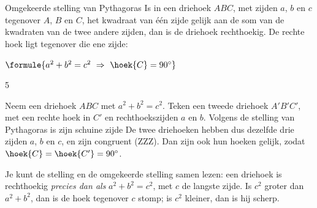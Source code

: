 \begin{theorie}
\begin{stelling}{Omgekeerde stelling van Pythagoras}
Is in een driehoek $ABC$, met zijden $a$, $b$ en $c$ tegenover $A$, $B$ en $C$, het kwadraat van één zijde gelijk aan de som van de kwadraten van de twee andere zijden, dan is de driehoek rechthoekig. De rechte hoek ligt tegenover die ene zijde:

\vspace{1mm}
\qquad $\formule{a^2 + b^2 = c^2 \ \Rightarrow \ \hoek{C} = 90^\circ}$
\end{stelling}
\begin{alleenvoor}{5}

\begin{bewijs}
Neem een driehoek $ABC$ met $a^2 + b^2 = c^2$. Teken een tweede driehoek $A'B'C'$, met een rechte hoek in $C'$ en rechthoekszijden $a$ en $b$. Volgens de stelling van Pythagoras is zijn schuine zijde
De twee driehoeken hebben dus dezelfde drie zijden $a$, $b$ en $c$, en zijn congruent (ZZZ). Dan zijn ook hun hoeken gelijk, zodat $\hoek{C} = \hoek{C'} = 90^\circ$.
\end{bewijs}
\end{alleenvoor}
\end{theorie}

Je kunt de stelling en de omgekeerde stelling samen lezen: een driehoek is rechthoekig \textit{precies dan als} $a^2 + b^2 = c^2$, met $c$ de langste zijde. Is $c^2$ groter dan $a^2 + b^2$, dan is de hoek tegenover $c$ stomp; is $c^2$ kleiner, dan is hij scherp.



